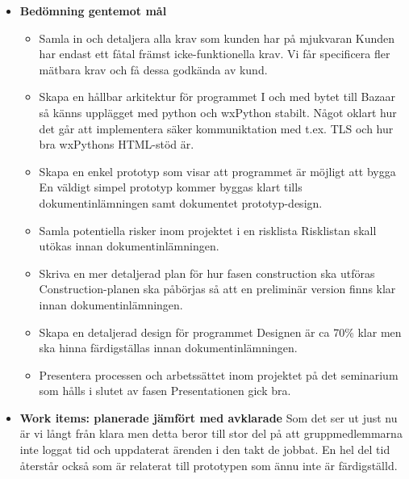 \begin{itemize}
	\item \textbf{Bedömning gentemot mål}
		\begin{itemize}
		\item Samla in och detaljera alla krav som kunden har på mjukvaran
		Kunden har endast ett fåtal främst icke-funktionella krav. Vi får specificera fler mätbara krav och få dessa godkända av kund.
		\item Skapa en hållbar arkitektur för programmet
		I och med bytet till Bazaar så känns upplägget med python och wxPython stabilt. Något oklart hur det går att implementera säker kommuniktation med t.ex. TLS och hur bra wxPythons HTML-stöd är.
		\item Skapa en enkel prototyp som visar att programmet är möjligt att bygga
		En väldigt simpel prototyp kommer byggas klart tills dokumentinlämningen samt dokumentet prototyp-design.
		\item Samla potentiella risker inom projektet i en risklista
		Risklistan skall utökas innan dokumentinlämningen.
		\item Skriva en mer detaljerad plan för hur fasen construction ska utföras
		Construction-planen ska påbörjas så att en preliminär version finns klar innan dokumentinlämningen.
		\item Skapa en detaljerad design för programmet
		Designen är ca 70\% klar men ska hinna färdigställas innan dokumentinlämningen.
		\item Presentera processen och arbetssättet inom projektet på det seminarium som hålls i slutet av fasen
		Presentationen gick bra.
		\end{itemize}
	
	\item \textbf{Work items: planerade jämfört med avklarade}
		Som det ser ut just nu är vi långt från klara men detta beror till stor del på att gruppmedlemmarna inte loggat tid och uppdaterat ärenden i den takt de jobbat. En hel del tid återstår 			också som är relaterat till prototypen som ännu inte är färdigställd.	
	

\end{itemize}
